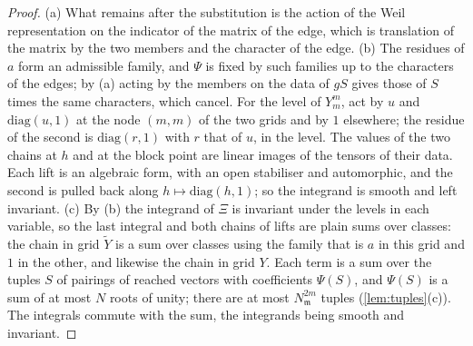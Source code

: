 \begin{proof}
(a) What remains after the substitution is the action of the Weil representation on the indicator of the matrix of the edge, which is translation of the matrix by the two members and the character of the edge. (b) The residues of
$a$ form an admissible family, and $\Psi$ is fixed by such families up to the characters of the edges; by (a) acting by the members on the data of $gS$ gives those of $S$ times the same characters, which cancel. For the level of
$Y^m_m$, act by $u$ and $\mathrm{diag}(u,1)$ at the node $(m,m)$ of the two grids and by $1$ elsewhere; the residue of the second is $\mathrm{diag}(r,1)$ with $r$ that of $u$, in the level. The values of the two chains at $h$ and at the block point are
linear images of the tensors of their data. Each lift is an algebraic form, with an open stabiliser and automorphic, and the second is pulled back along $h\mapsto\mathrm{diag}(h,1)$; so the integrand is smooth and left invariant. (c) By (b)
the integrand of $\Xi$ is invariant under the levels in each variable, so the last integral and both chains of lifts are plain sums over classes: the chain in grid $\tilde Y$ is a sum over classes using the family that is $a$ in this
grid and $1$ in the other, and likewise the chain in grid $Y$. Each term is a sum over the tuples $S$ of pairings of reached vectors with coefficients $\Psi(S)$, and $\Psi(S)$ is a sum of at most $N$ roots of unity; there are at most
$N_{\mathfrak m}^{2m}$ tuples (\cref{lem:tuples}(c)). The integrals commute with the sum, the integrands being smooth and invariant.
\end{proof}

